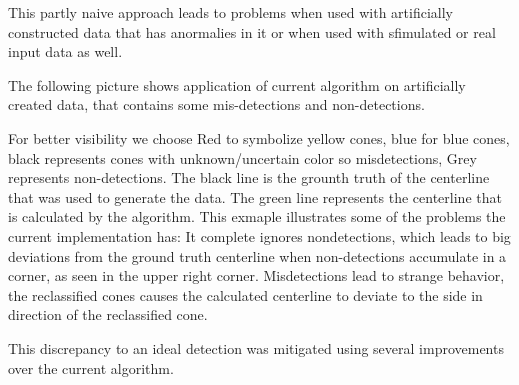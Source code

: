 This partly naive approach leads to problems when used with artificially constructed data that has anormalies in it or when used with sfimulated or real input data as well.

The following picture shows application of current algorithm on artificially created data, that contains some mis-detections and non-detections.

For better visibility we choose Red to symbolize yellow cones, blue for blue cones, black represents cones with unknown/uncertain color so misdetections, Grey represents non-detections. The black line is the grounth truth of the centerline that was used to generate the data. The green line represents the centerline that is calculated by the algorithm. This exmaple illustrates some of the problems the current implementation has: It complete ignores nondetections, which leads to big deviations from the ground truth centerline when non-detections accumulate in a corner, as seen in the upper right corner. Misdetections lead to strange behavior, the reclassified cones causes the calculated centerline to deviate to the side in direction of the reclassified cone.


This discrepancy to an ideal detection was mitigated using several improvements over the current algorithm.

